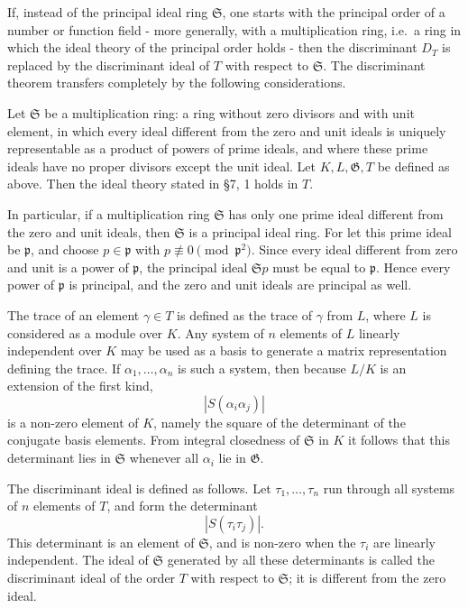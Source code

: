 \documentclass[
  12pt,
]{article}
\begin{document}
If, instead of the principal ideal ring \(\mathfrak S\), one starts with
the principal order of a number or function field - more generally, with
a multiplication ring, i.e.~a ring in which the ideal theory of the
principal order holds - then the discriminant \(D_T\) is replaced by the
discriminant ideal of \(T\) with respect to \(\mathfrak S\). The
discriminant theorem transfers completely by the following
considerations.

Let \(\mathfrak S\) be a multiplication ring: a ring without zero
divisors and with unit element, in which every ideal different from the
zero and unit ideals is uniquely representable as a product of powers of
prime ideals, and where these prime ideals have no proper divisors
except the unit ideal. Let \(K,L,\mathfrak G,T\) be defined as above.
Then the ideal theory stated in §7, 1 holds in \(T\).

In particular, if a multiplication ring \(\mathfrak S\) has only one
prime ideal different from the zero and unit ideals, then
\(\mathfrak S\) is a principal ideal ring. For let this prime ideal be
\(\mathfrak p\), and choose \(p\in\mathfrak p\) with
\(p\not\equiv0\pmod{\mathfrak p^2}\). Since every ideal different from
zero and unit is a power of \(\mathfrak p\), the principal ideal
\(\mathfrak S p\) must be equal to \(\mathfrak p\). Hence every power of
\(\mathfrak p\) is principal, and the zero and unit ideals are principal
as well.

The trace of an element \(\gamma\in T\) is defined as the trace of
\(\gamma\) from \(L\), where \(L\) is considered as a module over \(K\).
Any system of \(n\) elements of \(L\) linearly independent over \(K\)
may be used as a basis to generate a matrix representation defining the
trace. If \(\alpha_1,
\ldots,
\alpha_n\) is such a system, then because \(L/K\) is an extension of the
first kind, \[
  |S(\alpha_i\alpha_j)|
\] is a non-zero element of \(K\), namely the square of the determinant
of the conjugate basis elements. From integral closedness of
\(\mathfrak S\) in \(K\) it follows that this determinant lies in
\(\mathfrak S\) whenever all \(\alpha_i\) lie in \(\mathfrak G\).

The discriminant ideal is defined as follows. Let \(\tau_1,
\ldots,
\tau_n\) run through all systems of \(n\) elements of \(T\), and form
the determinant \[
  |S(\tau_i\tau_j)|.
\] This determinant is an element of \(\mathfrak S\), and is non-zero
when the \(\tau_i\) are linearly independent. The ideal of
\(\mathfrak S\) generated by all these determinants is called the
discriminant ideal of the order \(T\) with respect to \(\mathfrak S\);
it is different from the zero ideal.
\end{document}
